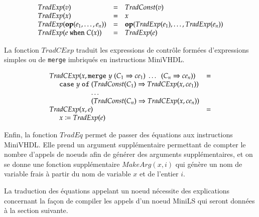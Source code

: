 \documentclass[9pt,a4paper]{article}
\newcommand{\mybox}[1]{\mbox{\tt{#1}}}
\newcommand{\ind}[0]{\hspace{0.5cm}}
\newcommand{\Op}[2]{\mybox{\bf{op}}(#1,\dots,#2)}
\newcommand{\When}[3]{#1 \; \mybox{when} \; #2(#3)}
\newcommand{\Merge}[5]{\mybox{merge} \; #1 \; (#2 \Rightarrow #3) \; \dots \; \
  (#4 \Rightarrow #5)}
\newcommand{\Affect}[2]{#1 \coloneqq #2}
\begin{document}
\newcommand{\TradE}[1]{TradExp(#1)}

\[
\begin{array}{lcl}
  \TradE{v} & = & \TradC{v} \\
  \TradE{x} & = & x \\
  \TradE{\Op{e_1}{e_n}} & = & \Op{\TradE{e_1}}{\TradE{e_n}} \\
  \TradE{\When{e}{C}{x}} & = & \TradE{e}
\end{array}
\]

La fonction $TradCExp$ traduit les expressions de contrôle formées d'expressions
simples ou de \texttt{merge} imbriqués en instructions MiniVHDL.

\newcommand{\TradCE}[2]{TradCExp(#1, #2)}

\[
\begin{array}{ll}
  \TradCE{x}{\Merge{y}{C_1}{ce_1}{C_n}{ce_n}} & = \\
  \ind \mathtt{case} \; y \; \mathtt{of} \;
  (\TradC{C_1} \Rightarrow \TradCE{x}{ce_1}) \\
  \hspace{2.1cm} \dots \\
  \hspace{2.1cm} (\TradC{C_n} \Rightarrow \TradCE{x}{ce_n}) \\
  \TradCE{x}{e} & = \\
  \ind \Affect{x}{\TradE{e}}
\end{array}
\]

Enfin, la fonction $TradEq$ permet de passer des équations aux instructions
MiniVHDL. Elle prend un argument supplémentaire permettant de compter le nombre
d'appels de noeuds afin de générer des arguments supplémentaires, et on se donne
une fonction supplémentaire $MakeArg(x,i)$ qui génère un nom de variable frais à
partir du nom de variable $x$ et de l'entier $i$.

La traduction des équations appelant un noeud nécessite des explications
concernant la façon de compiler les appels d'un noeud MiniLS qui seront données
à la section suivante.

\newcommand{\TradEq}[2]{TradEq(#1,#2)}
\newcommand{\MA}[2]{MakeArg(#1,#2)}
\end{document}
